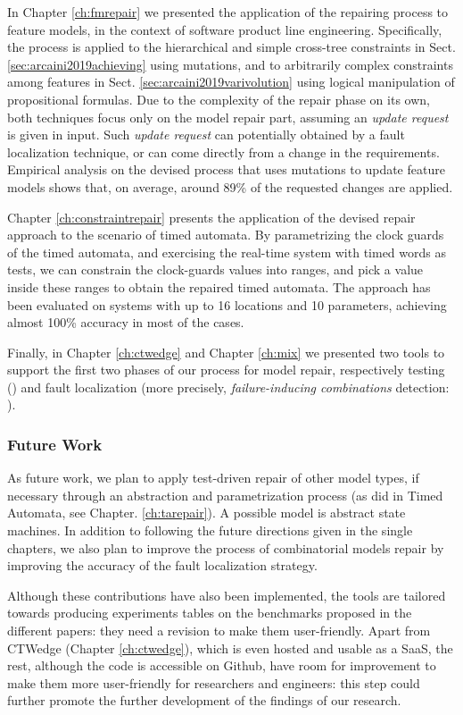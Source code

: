 \begin{tikzborder}{\cite{Gargantini16:validation}}
\begin{tikzborder}{\cite{gargantini_combinatorial_2017}}
\begin{tikzborder}{\cite{garn2019}}
\begin{tikzborder}{\cite{arcaini2019achieving}}
In Chapter \ref{ch:fmrepair} we presented the application of the repairing process to feature models, in the context of software product line engineering.
Specifically, the process is applied to the hierarchical and simple cross-tree constraints in Sect. \ref{sec:arcaini2019achieving} using mutations, and to arbitrarily complex constraints among features in Sect. \ref{sec:arcaini2019varivolution} using logical manipulation of propositional formulas.
Due to the complexity of the repair phase on its own, both techniques focus only on the model repair part, assuming an \textit{update request} is given in input. Such \textit{update request} can potentially obtained by a fault localization technique, or can come directly from a change in the requirements.
Empirical analysis on the devised process that uses mutations to update feature models shows that, on average, around 89\% of the requested changes are applied.

Chapter \ref{ch:constraintrepair} presents the application of the devised repair approach to the scenario of timed automata. By parametrizing the clock guards of the timed automata, and exercising the real-time system with timed words as tests, we can constrain the clock-guards values into ranges, and pick a value inside these ranges to obtain the repaired timed automata. The approach has been evaluated on systems with up to 16 locations and 10 parameters, achieving almost 100\% accuracy in most of the cases.

Finally, in Chapter \ref{ch:ctwedge} and Chapter \ref{ch:mix} we presented two tools to support the first two phases of our process for model repair, respectively testing (\ctwedge) and fault localization (more precisely, \textit{failure-inducing combinations} detection: \mix).

\subsubsection{Future Work}
As future work, we plan to apply test-driven repair of other model types, if necessary through an abstraction and parametrization process (as did in Timed Automata, see Chapter. \ref{ch:tarepair}). A possible model is abstract state machines. 
In addition to following the future directions given in the single chapters, we also plan to improve the process of combinatorial models repair by improving the accuracy of the fault localization strategy.

Although these contributions have also been implemented, the tools are tailored towards producing experiments tables on the benchmarks proposed in the different papers: they need a revision to make them user-friendly. Apart from CTWedge (Chapter \ref{ch:ctwedge}), which is even hosted and usable as a SaaS, the rest, although the code is accessible on Github, have room for improvement to make them more user-friendly for researchers and engineers: this step could further promote the further development of the findings of our research. 


\end{tikzborder}
\end{tikzborder}
\end{tikzborder}
\end{tikzborder}
